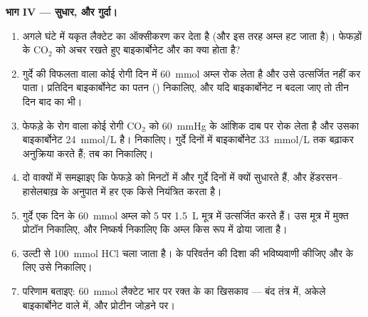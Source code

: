 \begin{problem}
\medskip
\noindent\textbf{भाग IV --- सुधार, और गुर्दा।}
\begin{enumerate}[resume]
  \item अगले घंटे में यकृत लैक्टेट का ऑक्सीकरण कर देता है (और इस तरह
        अम्ल हट जाता है)। फेफड़ों के $\mathrm{CO_2}$ को अचर रखते हुए
        बाइकार्बोनेट और  का क्या होता है?
  \item गुर्दे की विफलता वाला कोई रोगी दिन में \qty{60}{mmol} अम्ल रोक
        लेता है और उसे उत्सर्जित नहीं कर पाता। प्रतिदिन बाइकार्बोनेट का
        पतन () निकालिए, और यदि बाइकार्बोनेट न बदला जाए तो
        तीन दिन बाद का  भी।
  \item फेफड़े के रोग वाला कोई रोगी $\mathrm{CO_2}$ को \qty{60}{mmHg}
        के आंशिक दाब पर रोक लेता है और उसका बाइकार्बोनेट
        \qty{24}{mmol/L} है।  निकालिए। गुर्दे दिनों में बाइकार्बोनेट
        \qty{33}{mmol/L} तक बढ़ाकर अनुक्रिया करते हैं; तब का 
        निकालिए।
  \item दो वाक्यों में समझाइए कि फेफड़े  को मिनटों में और गुर्दे
        दिनों में क्यों सुधारते हैं, और हेंडरसन--हासेलबाख़ के अनुपात में
        हर एक किसे नियंत्रित करता है।
  \item गुर्दे एक दिन के \qty{60}{mmol} अम्ल को  5 पर \qty{1.5}{L}
        मूत्र में उत्सर्जित करते हैं। उस मूत्र में मुक्त प्रोटॉन
        निकालिए, और निष्कर्ष निकालिए कि अम्ल किस रूप में ढोया जाता है।
  \item उल्टी से \qty{100}{mmol} HCl चला जाता है।  के परिवर्तन की
        दिशा की भविष्यवाणी कीजिए और  के लिए उसे निकालिए।
  \item परिणाम बताइए: \qty{60}{mmol} लैक्टेट भार पर रक्त के  का
        खिसकाव --- बंद तंत्र में, अकेले बाइकार्बोनेट वाले 
        में, और प्रोटीन  जोड़ने पर।
\end{enumerate}
\end{problem}
